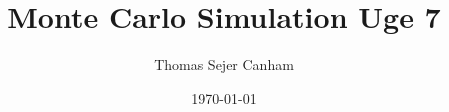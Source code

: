 \documentclass{article}
\title{Monte Carlo Simulation Uge 7}
\author{Thomas Sejer Canham}
\date{\today}
\theoremstyle{definition}
\theoremstyle{remark}
\begin{document}

\begin{titlepage}

    \maketitle
    \thispagestyle{empty}

\end{titlepage}
\end{document}
